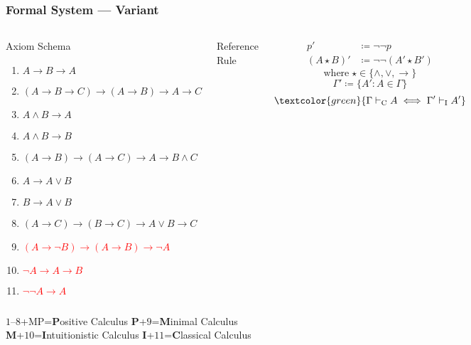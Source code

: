 \documentclass[UTF8,aspectratio=43,11pt,colorlinks,compress,openany]{beamer}%
\begin{document}
\begin{frame}\frametitle{Formal System --- Variant}\vspace*{-5pt}
	\begin{columns}
			\begin{block}{Axiom Schema}
				\begin{enumerate}
					\item $A\to B\to A$
					\item $(A\to B\to C)\to(A\to B)\to A\to C$
					\item $A\wedge B\to A$
					\item $A\wedge B\to B$
					\item $(A\to B)\to(A\to C)\to A\to B\wedge C$
					\item $A\to A\vee B$
					\item $B\to A\vee B$
					\item $(A\to C)\to(B\to C)\to A\vee B\to C$
					\item \textcolor{red}{$(A\to\neg B)\to(A\to B)\to\neg A$}
					\item \textcolor{red}{$\neg A\to A\to B$}
					\item \textcolor{red}{$\neg\neg A\to A$}
				\end{enumerate}
			\end{block}
			\begin{block}{Reference Rule}
				\begin{prooftree}
					\alwaysSingleLine
					\RightLabel{\textcolor{yellow}{[MP]}}
				\end{prooftree}
			\end{block}
			\vbox{
				\begin{align*}
				p'&\coloneqq \neg\neg p\\
				(A\star B)'&\coloneqq \neg\neg(A'\star B')
				\end{align*}\vspace{-21pt}
				\[\text{where}\;\star\in\{\wedge,\vee,\to\}\]
				\[\Gamma'\coloneqq \{A': A\in\Gamma\}\]
				\[\textcolor{green}{\Gamma\vdash_{\mathrm{C}} A\iff\Gamma'\vdash_{\mathrm{I}} A'}\]
			}
	\end{columns}
	\vspace{5pt}\centering
	$1$--$8$+MP=\textbf{P}ositive Calculus \quad \textbf{P}+$9$=\textbf{M}inimal Calculus\\
	\textbf{M}+$10$=\textbf{I}ntuitionistic Calculus \quad \textbf{I}+$11$=\textbf{C}lassical Calculus
\end{frame}
\end{document}
